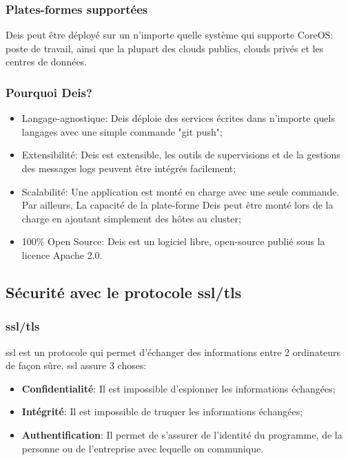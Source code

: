 \begin{onehalfspace}
\subsubsection*{Plates-formes supportées}
Deis peut être déployé sur un n'importe quelle système qui supporte CoreOS: poste de travail, ainsi que la plupart des clouds publics, clouds privés et les centres de données.


\subsubsection*{Pourquoi Deis?}

\begin{itemize}
	\item Langage-agnostique: Deis déploie des services écrites dans n'importe quels langages avec une simple commande "git push";
	\item Extensibilité: Deis est extensible, les outils de supervisions et de la gestions des messages logs peuvent être intégrés facilement;
	\item Scalabilité: Une application est monté en charge avec une seule commande. Par ailleurs, La capacité de la plate-forme Deis peut être monté lors de la charge en ajoutant simplement des hôtes au cluster;
	\item 100\% Open Source: Deis est un logiciel libre, open-source publié sous la licence Apache 2.0.
\end{itemize}








\subsection{Sécurité avec le protocole \acrshort{ssl}/\acrshort{tls}}

\subsubsection{\acrshort{ssl}/\acrshort{tls}}

\acrshort{ssl} est un protocole qui permet d'échanger des informations entre 2 ordinateurs de façon sûre. \acrshort{ssl} assure 3 choses:

\begin{itemize}
	\item \textbf{Confidentialité}: Il est impossible d'espionner les informations échangées;
	\item \textbf{Intégrité}: Il est impossible de truquer les informations échangées;
	\item \textbf{Authentification}: Il permet de s'assurer de l'identité du programme, de la personne ou de l'entreprise avec lequelle on communique.
\end{itemize}




\end{onehalfspace}
